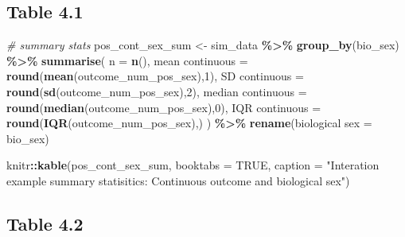 \documentclass[
]{book}
\newenvironment{Shaded}{\begin{snugshade}}{\end{snugshade}}
\newcommand{\AttributeTok}[1]{\textcolor[rgb]{0.13,0.29,0.53}{#1}}
\newcommand{\CommentTok}[1]{\textcolor[rgb]{0.56,0.35,0.01}{\textit{#1}}}
\newcommand{\ConstantTok}[1]{\textcolor[rgb]{0.56,0.35,0.01}{#1}}
\newcommand{\DecValTok}[1]{\textcolor[rgb]{0.00,0.00,0.81}{#1}}
\newcommand{\FunctionTok}[1]{\textcolor[rgb]{0.13,0.29,0.53}{\textbf{#1}}}
\newcommand{\NormalTok}[1]{#1}
\newcommand{\OtherTok}[1]{\textcolor[rgb]{0.56,0.35,0.01}{#1}}
\newcommand{\SpecialCharTok}[1]{\textcolor[rgb]{0.81,0.36,0.00}{\textbf{#1}}}
\newcommand{\StringTok}[1]{\textcolor[rgb]{0.31,0.60,0.02}{#1}}
\begin{document}
\subsection{Table 4.1}\label{table-4.1}

\begin{Shaded}
\begin{Highlighting}[]
\CommentTok{\# summary stats}
\NormalTok{pos\_cont\_sex\_sum }\OtherTok{\textless{}{-}}\NormalTok{ sim\_data }\SpecialCharTok{\%\textgreater{}\%} \FunctionTok{group\_by}\NormalTok{(bio\_sex) }\SpecialCharTok{\%\textgreater{}\%} 
  \FunctionTok{summarise}\NormalTok{(}
    \AttributeTok{n =} \FunctionTok{n}\NormalTok{(), }
    \StringTok{\textasciigrave{}}\AttributeTok{mean continuous}\StringTok{\textasciigrave{}} \OtherTok{=} \FunctionTok{round}\NormalTok{(}\FunctionTok{mean}\NormalTok{(outcome\_num\_pos\_sex),}\DecValTok{1}\NormalTok{),}
    \StringTok{\textasciigrave{}}\AttributeTok{SD continuous}\StringTok{\textasciigrave{}} \OtherTok{=} \FunctionTok{round}\NormalTok{(}\FunctionTok{sd}\NormalTok{(outcome\_num\_pos\_sex),}\DecValTok{2}\NormalTok{),}
    \StringTok{\textasciigrave{}}\AttributeTok{median continuous}\StringTok{\textasciigrave{}} \OtherTok{=} \FunctionTok{round}\NormalTok{(}\FunctionTok{median}\NormalTok{(outcome\_num\_pos\_sex),}\DecValTok{0}\NormalTok{),}
    \StringTok{\textasciigrave{}}\AttributeTok{IQR continuous}\StringTok{\textasciigrave{}} \OtherTok{=} \FunctionTok{round}\NormalTok{(}\FunctionTok{IQR}\NormalTok{(outcome\_num\_pos\_sex),)}
\NormalTok{  ) }\SpecialCharTok{\%\textgreater{}\%} 
  \FunctionTok{rename}\NormalTok{(}\StringTok{\textasciigrave{}}\AttributeTok{biological sex}\StringTok{\textasciigrave{}} \OtherTok{=}\NormalTok{ bio\_sex) }

\NormalTok{knitr}\SpecialCharTok{::}\FunctionTok{kable}\NormalTok{(pos\_cont\_sex\_sum, }\AttributeTok{booktabs =} \ConstantTok{TRUE}\NormalTok{, }\AttributeTok{caption =} \StringTok{"Interation example summary statisitics: Continuous outcome and biological sex"}\NormalTok{)}
\end{Highlighting}
\end{Shaded}

\subsection{Table 4.2}\label{table-4.2}
\end{document}
